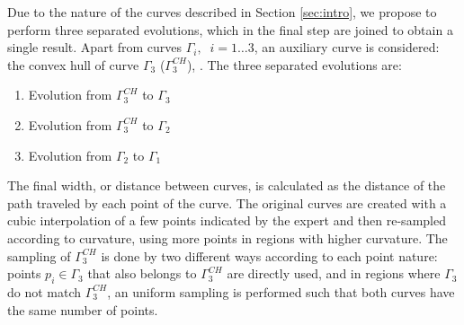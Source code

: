 \documentclass{article}
\begin{document}
Due to the nature of the curves described in Section \ref{sec:intro}, we propose to perform three separated evolutions, which in the final step are joined to obtain a single result. Apart from curves $\Gamma_i,\;\; i=1\dots3$, an auxiliary curve is considered: the convex hull of curve $\Gamma_3$ ($\Gamma_3^{CH}$), \cite{libro}. The three separated evolutions are:
\begin{enumerate}
  \item Evolution from $\Gamma_3^{CH}$ to $\Gamma_3$
  \item Evolution from $\Gamma_3^{CH}$ to $\Gamma_2$
  \item Evolution from $\Gamma_2$ to $\Gamma_1$
\end{enumerate}
The final width, or distance between curves, is calculated as the distance of the path traveled by each point of the curve. The original curves are created with a cubic interpolation of a few points indicated by the expert and then re-sampled according to curvature, using more points in regions with higher curvature. The sampling of $\Gamma_3^{CH}$ is done by two different ways according to each point nature: points $p_i\in\Gamma_{3}$ that also belongs to $\Gamma_3^{CH}$ are directly used, and in regions where $\Gamma_3$ do not match $\Gamma_3^{CH}$, an uniform sampling is performed such that both curves have the same number of points.
\end{document}
